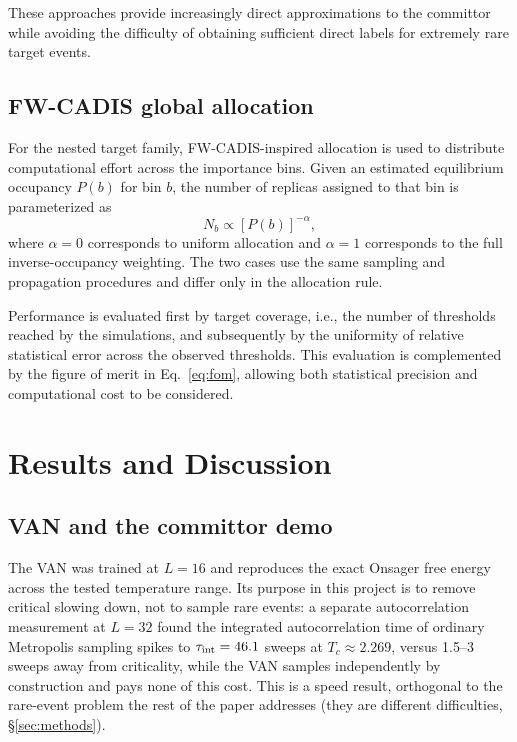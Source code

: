 \documentclass[a4paper,fleqn]{cas-sc}
\let\Oldsubsection\subsection
\renewcommand{\subsection}{\FloatBarrier\Oldsubsection}
\begin{document}
These approaches provide increasingly direct approximations to the committor while avoiding the difficulty of obtaining sufficient direct labels for extremely rare target events.

\subsection{FW-CADIS global allocation}\label{sec:fwcadis-method}

For the nested target family, FW-CADIS-inspired allocation is used to distribute computational effort across the importance bins. Given an estimated equilibrium occupancy $P(b)$ for bin $b$, the number of replicas assigned to that bin is parameterized as
\begin{equation}
N_b\propto [P(b)]^{-\alpha},
\end{equation}
where $\alpha=0$ corresponds to uniform allocation and $\alpha=1$ corresponds to the full inverse-occupancy weighting. The two cases use the same sampling and propagation procedures and differ only in the allocation rule.

Performance is evaluated first by target coverage, i.e., the number of thresholds reached by the simulations, and subsequently by the uniformity of relative statistical error across the observed thresholds. This evaluation is complemented by the figure of merit in Eq.~\eqref{eq:fom}, allowing both statistical precision and computational cost to be considered.


\FloatBarrier


\section{Results and Discussion}\label{sec:results}

\subsection{VAN and the committor demo}\label{sec:res-van}
The VAN was trained at $L=16$ and reproduces the exact Onsager free energy across the
tested temperature range. Its purpose in this project is to remove critical slowing down,
not to sample rare events: a separate autocorrelation measurement at $L=32$ found the
integrated autocorrelation time of ordinary Metropolis sampling spikes to $\tau_{\rm
	int}=46.1$ sweeps at $T_c\approx2.269$, versus 1.5--3 sweeps away from criticality, while
the VAN samples independently by construction and pays none of this cost. This is a speed
result, orthogonal to the rare-event problem the rest of the paper addresses (they are
different difficulties, \S\ref{sec:methods}).
\end{document}
